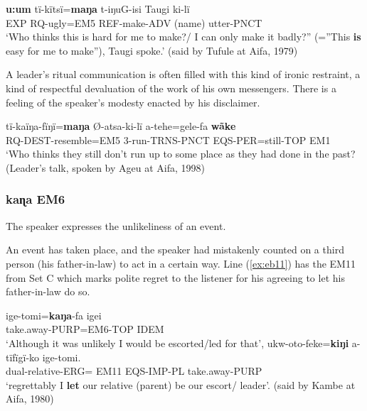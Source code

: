 \documentclass[output=paper]{langsci/langscibook}
\begin{document}
\begin{exe}
	\ex \label{ex:eb8}
	\gll \textbf{u:um} tï-kïtsï=\textbf{maŋa} t-iŋuG-isi Taugi ki-lï\\
	EXP RQ-ugly=EM5 REF-make-ADV (name) utter-PNCT\\
	\trans ‘Who thinks this is hard for me to make?/ I can only make it badly?” (=”This \textbf{is} easy for me to make”), Taugi spoke.’ (said by Tufule at Aifa, 1979)
\end{exe}

A leader’s ritual communication is often filled with this kind of ironic restraint, a kind of respectful devaluation of the work of his own messengers.  There is a feeling of the speaker’s modesty enacted by his disclaimer. 


\begin{exe}
	\ex \label{ex:eb9}
	\gll tï-kaïŋa-fïŋï=\textbf{maŋa} Ø-atsa-ki-lï a-tehe=gele-fa \textbf{wãke}\\
	RQ-DEST-resemble=EM5 3-run-TRNS-PNCT EQS-PER=still-TOP EM1\\
	\trans ‘Who thinks they still don’t run up to some place as they had done in the past? (Leader’s talk, spoken by Ageu at Aifa, 1998)
\end{exe}

\subsubsection{kaɳa EM6} 
The speaker expresses the unlikeliness of an event. 

An event has taken place,  and the speaker had mistakenly counted on a third person (his father-in-law)  to act in a certain way.  Line (\ref{ex:eb11}) has the EM11 from Set C which marks polite regret to the listener for his agreeing to let his father-in-law do so.

\begin{exe}
	\ex
	\begin{xlist}
	\ex \label{ex:eb10}
	\gll ige-tomi=\textbf{kaŋa}-fa igei\\
	take.away-PURP=EM6-TOP IDEM\\
	\trans ‘Although it was unlikely  I would be escorted/led for that’,
	\ex \label{ex:eb11}
	\gll ukw-oto-feke=\textbf{kiŋi} a-tïfïgï-ko ige-tomi.\\
	dual-relative-ERG= EM11 EQS-IMP-PL take.away-PURP\\
	\trans ‘regrettably  I \textbf{let} our relative (parent) be our escort/ leader’. (said by Kambe at Aifa, 1980)
	\end{xlist}
\end{exe}
\end{document}
